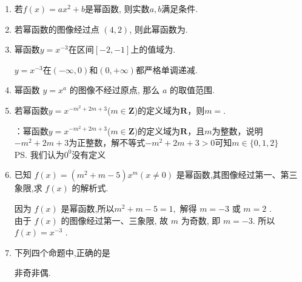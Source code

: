 \begin{enumerate}
    \item 若$f(x)=ax^2+b$是幂函数, 则实数$a,b$满足条件. 
    
    \item 若幂函数的图像经过点 $(4,2)$, 则此幂函数为.
    
    \item 幂函数$y=x^{-3}$在区间$[-2,-1]$上的值域为\blkda{$[-1,-\frac{1}{8}]$}. 
    \begin{jieda}
    $y=x^{-3}$在$(-\infty,0)$和$(0,+\infty)$都严格单调递减. 
    \end{jieda}
    
    \item 幂函数 $y=x^a$ 的图像不经过原点, 那么 $a$ 的取值范围.
    \item 若幂函数$y = x^{-m^2+2m+3}$($m \in \mathbf{Z}$)的定义域为$\mathbf{R}$，则$m = $.
    \begin{jieda}
        ：幂函数$y = x^{-m^2+2m+3}$($m \in \mathbf{Z}$)的定义域为$\mathbf{R}$，且$m$为整数，说明$-m^2+2m+3$为正整数，解不等式$-m^2+2m+3 > 0$可知$m \in \{0,1,2\}$ \\
        \ps 我们认为$0^0$没有定义
    \end{jieda} 
    \item 已知 $f\left( x\right)  = \left( m^2+m-5\right) {x}^{m}\left( {x \neq  0}\right)$ 是幂函数,其图像经过第一、第三象限,求 $f\left( x\right)$ 的解析式.
    \begin{jieda}
        因为 $f\left( x\right)$ 是幂函数,所以$m^2+m-5 = 1,$ 解得 $m =  - 3$ 或 $m = 2$ . \\
        由于 $f\left( x\right)$ 的图像经过第一、三象限, 故 $m$ 为奇数, 即 $m =  - 3$. 所以 $f\left( x\right)  = {x}^{-3}$ .
    \end{jieda}
    
    \item 下列四个命题中,正确的是
    \begin{jieda}
        非奇非偶.
    \end{jieda}
    

\end{enumerate}
